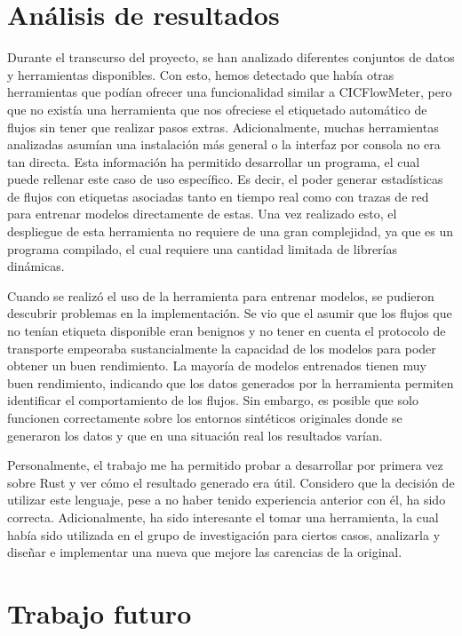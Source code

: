 \section{Análisis de resultados}

Durante el transcurso del proyecto, se han analizado diferentes conjuntos de datos y herramientas disponibles. Con esto, hemos detectado que había otras herramientas que podían ofrecer una funcionalidad similar a CICFlowMeter, pero que no existía una herramienta que nos ofreciese el etiquetado automático de flujos sin tener que realizar pasos extras. Adicionalmente, muchas herramientas analizadas asumían una instalación más general o la interfaz por consola no era tan directa. Esta información ha permitido desarrollar un programa, el cual puede rellenar este caso de uso específico. Es decir, el poder generar estadísticas de flujos con etiquetas asociadas tanto en tiempo real como con trazas de red para entrenar modelos directamente de estas. Una vez realizado esto, el despliegue de esta herramienta no requiere de una gran complejidad, ya que es un programa compilado, el cual requiere una cantidad limitada de librerías dinámicas.

Cuando se realizó el uso de la herramienta para entrenar modelos, se pudieron descubrir problemas en la implementación. Se vio que el asumir que los flujos que no tenían etiqueta disponible eran benignos y no tener en cuenta el protocolo de transporte empeoraba sustancialmente la capacidad de los modelos para poder obtener un buen rendimiento. La mayoría de modelos entrenados tienen muy buen rendimiento, indicando que los datos generados por la herramienta permiten identificar el comportamiento de los flujos. Sin embargo, es posible que solo funcionen correctamente sobre los entornos sintéticos originales donde se generaron los datos y que en una situación real los resultados varían.

Personalmente, el trabajo me ha permitido probar a desarrollar por primera vez sobre Rust y ver cómo el resultado generado era útil. Considero que la decisión de utilizar este lenguaje, pese a no haber tenido experiencia anterior con él, ha sido correcta. Adicionalmente, ha sido interesante el tomar una herramienta, la cual había sido utilizada en el grupo de investigación para ciertos casos, analizarla y diseñar e implementar una nueva que mejore las carencias de la original.

\section{Trabajo futuro}

